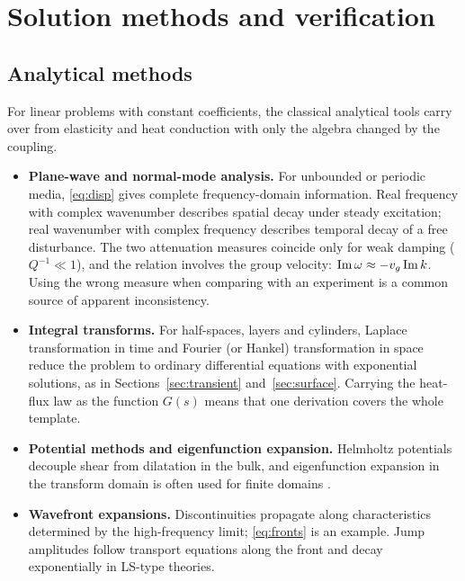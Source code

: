 \section{Solution methods and verification}\label{sec:methods}
\subsection{Analytical methods}
For linear problems with constant coefficients, the classical analytical tools carry over from elasticity and heat conduction with only the algebra changed by the coupling.
\begin{itemize}
\item \textbf{Plane-wave and normal-mode analysis.} For unbounded or periodic media, \eqref{eq:disp} gives complete frequency-domain information. Real frequency with complex wavenumber describes spatial decay under steady excitation; real wavenumber with complex frequency describes temporal decay of a free disturbance. The two attenuation measures coincide only for weak damping ($Q^{-1}\ll1$), and the relation involves the group velocity: $\operatorname{Im}\omega\approx-v_g\operatorname{Im} k$. Using the wrong measure when comparing with an experiment is a common source of apparent inconsistency.
\item \textbf{Integral transforms.} For half-spaces, layers and cylinders, Laplace transformation in time and Fourier (or Hankel) transformation in space reduce the problem to ordinary differential equations with exponential solutions, as in Sections~\ref{sec:transient} and~\ref{sec:surface}. Carrying the heat-flux law as the function $G(s)$ means that one derivation covers the whole template.
\item \textbf{Potential methods and eigenfunction expansion.} Helmholtz potentials decouple shear from dilatation in the bulk, and eigenfunction expansion in the transform domain is often used for finite domains \citep{Singh2020a}.
\item \textbf{Wavefront expansions.} Discontinuities propagate along characteristics determined by the high-frequency limit; \eqref{eq:fronts} is an example. Jump amplitudes follow transport equations along the front and decay exponentially in LS-type theories.
\end{itemize}

